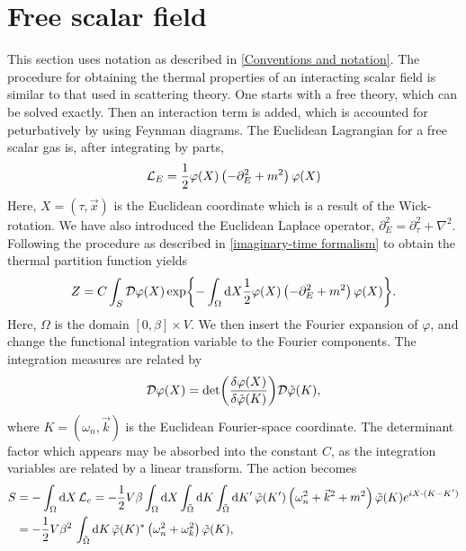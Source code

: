\section{Free scalar field}
\label{section:free scalar field}

This section uses notation as described in \autoref{Conventions and notation}.
The procedure for obtaining the thermal properties of an interacting scalar field is similar to that used in scattering theory.
One starts with a free theory, which can be solved exactly.
Then an interaction term is added, which is accounted for peturbatively by using Feynman diagrams.
The Euclidean Lagrangian for a free scalar gas is, after integrating by parts,
\begin{equation}
    \mathcal{L}_E = \frac{1}{2} \varphi(X) \left( -\partial_E^2 + m^2 \right) \varphi(X)
\end{equation}
Here, $X = (\tau, \vec x)$ is the Euclidean coordinate which is a result of the Wick-rotation.
We have also introduced the Euclidean Laplace operator, $\partial_E^2 = \partial_\tau^2 + \nabla^2$.
Following the procedure as described in \autoref{imaginary-time formalism} to obtain the thermal partition function yields
\begin{equation}
    Z = C \int_S \mathcal{D} \varphi(X) 
    \exp{
        - \int_\Omega \dd X \frac{1}{2} 
        \varphi(X) \left( -\partial_E^2 + m^2 \right) \varphi(X)
    }.
\end{equation}
Here, $\Omega$ is the domain $[0, \beta] \times V$.
We then insert the Fourier expansion of $\varphi$, and change the functional integration variable to the Fourier components.
The integration measures are related by
\begin{equation*}
    \mathcal{D} \varphi(X) = \det(\frac{\delta \varphi(X)}{\delta \tilde \varphi(K)}) \mathcal{D}\tilde \varphi(K),
\end{equation*}
where $K = (\omega_n, \vec k)$ is the Euclidean Fourier-space coordinate.
The determinant factor which appears may be absorbed into the constant $C$, as the integration variables are related by a linear transform.
The action becomes 
\begin{align*}
    S & = - \int_\Omega \dd X\, \mathcal{L}_e 
    = - \frac{1}{2} V \beta \int_\Omega \dd X \int_{\tilde \Omega} \dd K \int_{\tilde \Omega} \dd K' \,
    \tilde \varphi(K') 
    \left(
        \omega_n^2 + \vec k^2 + m^2
    \right)
    \tilde \varphi(K)
    e^{iX\cdot(K - K')} \\
    & = - \frac{1}{2} V \beta^2 \, \int_{\tilde \Omega} \dd K \,
    \tilde \varphi(K)^*
    \left(
        \omega_n^2 + \omega_k^2
    \right)
    \tilde \varphi(K),
\end{align*}
